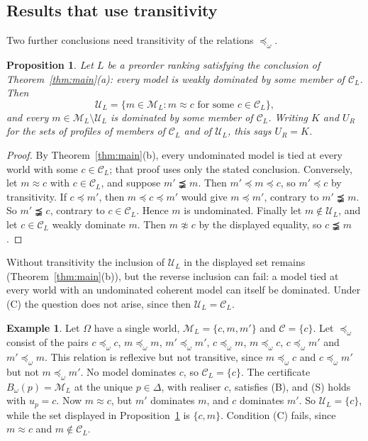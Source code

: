 \documentclass[11pt]{article}
\newtheorem{proposition}[theorem]{Proposition}
\theoremstyle{definition}
\newtheorem{example}[theorem]{Example}
\theoremstyle{remark}
\newcommand{\M}{\mathcal M}
\newcommand{\C}{\mathcal C}
\newcommand{\U}{\mathcal U}
\begin{document}
\subsection{Results that use transitivity}\label{sec:preorder}
Two further conclusions need transitivity of the relations $\preceq_\omega$.

\begin{proposition}\label{prop:profiles}
Let $L$ be a preorder ranking satisfying the conclusion of Theorem~\ref{thm:main}(a): every model is weakly dominated by some member of $\C_L$. Then
\[
 \U_L=\{m\in\M_L:m\approx c\text{ for some }c\in\C_L\},
\]
and every $m\in\M_L\setminus\U_L$ is dominated by some member of $\C_L$. Writing $K$ and $U_R$ for the sets of profiles of members of $\C_L$ and of $\U_L$, this says $U_R=K$.
\end{proposition}
\begin{proof}
By Theorem~\ref{thm:main}(b), every undominated model is tied at every world with some $c\in\C_L$; that proof uses only the stated conclusion. Conversely, let $m\approx c$ with $c\in\C_L$, and suppose $m'\precneqq m$. Then $m'\preceq m\preceq c$, so $m'\preceq c$ by transitivity. If $c\preceq m'$, then $m\preceq c\preceq m'$ would give $m\preceq m'$, contrary to $m'\precneqq m$. So $m'\precneqq c$, contrary to $c\in\C_L$. Hence $m$ is undominated. Finally let $m\notin\U_L$, and let $c\in\C_L$ weakly dominate $m$. Then $m\not\approx c$ by the displayed equality, so $c\precneqq m$.
\end{proof}
Without transitivity the inclusion of $\U_L$ in the displayed set remains (Theorem~\ref{thm:main}(b)), but the reverse inclusion can fail: a model tied at every world with an undominated coherent model can itself be dominated. Under (C) the question does not arise, since then $\U_L=\C_L$.

\begin{example}\label{ex:intransitive}
Let $\Omega$ have a single world, $\M_L=\{c,m,m'\}$ and $\C=\{c\}$. Let $\preceq_\omega$ consist of the pairs $c\preceq_\omega c$, $m\preceq_\omega m$, $m'\preceq_\omega m'$, $c\preceq_\omega m$, $m\preceq_\omega c$, $c\preceq_\omega m'$ and $m'\preceq_\omega m$. This relation is reflexive but not transitive, since $m\preceq_\omega c$ and $c\preceq_\omega m'$ but not $m\preceq_\omega m'$. No model dominates $c$, so $\C_L=\{c\}$. The certificate $B_\omega(p)=\M_L$ at the unique $p\in\Delta$, with realiser $c$, satisfies (B), and (S) holds with $u_p=c$. Now $m\approx c$, but $m'$ dominates $m$, and $c$ dominates $m'$. So $\U_L=\{c\}$, while the set displayed in Proposition~\ref{prop:profiles} is $\{c,m\}$. Condition (C) fails, since $m\approx c$ and $m\notin\C_L$.
\end{example}
\end{document}
